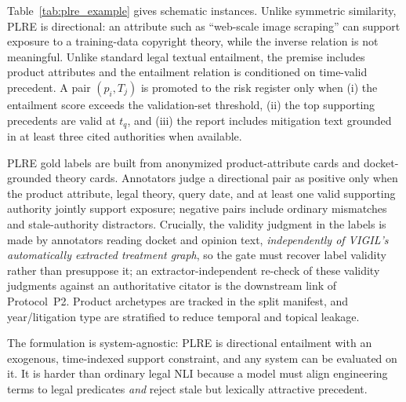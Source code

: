 Table~\ref{tab:plre_example} gives schematic instances. Unlike symmetric similarity, PLRE is directional: an attribute such as ``web-scale image scraping'' can support exposure to a training-data copyright theory, while the inverse relation is not meaningful. Unlike standard legal textual entailment, the premise includes product attributes and the entailment relation is conditioned on time-valid precedent. A pair $(p_i,T_j)$ is promoted to the risk register only when (i) the entailment score exceeds the validation-set threshold, (ii) the top supporting precedents are valid at $t_q$, and (iii) the report includes mitigation text grounded in at least three cited authorities when available.

PLRE gold labels are built from anonymized product-attribute cards and docket-grounded theory cards. Annotators judge a directional pair as positive only when the product attribute, legal theory, query date, and at least one valid supporting authority jointly support exposure; negative pairs include ordinary mismatches and stale-authority distractors. Crucially, the validity judgment in the labels is made by annotators reading docket and opinion text, \emph{independently of VIGIL's automatically extracted treatment graph}, so the gate must recover label validity rather than presuppose it; an extractor-independent re-check of these validity judgments against an authoritative citator is the downstream link of Protocol~P2. Product archetypes are tracked in the split manifest, and year/litigation type are stratified to reduce temporal and topical leakage.

The formulation is system-agnostic: PLRE is directional entailment with an exogenous, time-indexed support constraint, and any system can be evaluated on it. It is harder than ordinary legal NLI because a model must align engineering terms to legal predicates \emph{and} reject stale but lexically attractive precedent.
